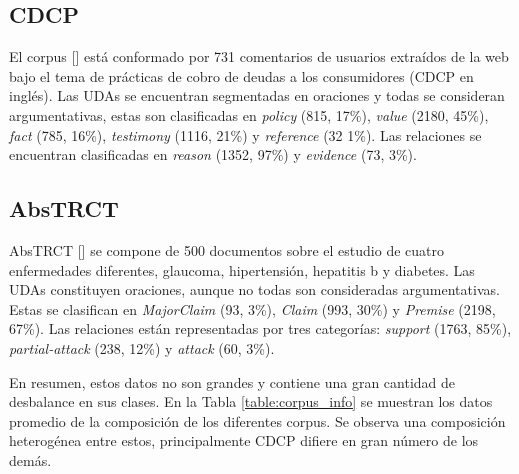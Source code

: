 \subsection{CDCP}\label{corpus:cdcp}

El corpus [\cite{niculae2017argument}] está conformado por 731 comentarios de usuarios extraídos de la web bajo el tema de 
prácticas de cobro de deudas a los consumidores (CDCP en inglés).
Las UDAs se encuentran segmentadas en oraciones y todas se consideran argumentativas, estas son clasificadas en 
\emph{policy} (815, 17\%), \emph{value} (2180, 45\%), \emph{fact} (785, 16\%), \emph{testimony} (1116, 21\%) y \emph{reference} (32 1\%). 
Las relaciones se encuentran clasificadas en \emph{reason} (1352, 97\%) y \emph{evidence} (73, 3\%).

\subsection{AbsTRCT}

AbsTRCT [\cite{mayer2020transformer}] se compone de 500 documentos sobre el estudio de cuatro enfermedades diferentes,
glaucoma, hipertensión, hepatitis b y diabetes. Las UDAs constituyen oraciones, aunque no todas son consideradas
argumentativas. Estas se clasifican en \emph{MajorClaim} (93, 3\%), \emph{Claim} (993, 30\%) y \emph{Premise} (2198, 67\%).
Las relaciones están representadas por tres categorías: \emph{support} (1763, 85\%), \emph{partial-attack} (238, 12\%) y
\emph{attack} (60, 3\%).

En resumen, estos datos no son grandes y contiene una gran cantidad de desbalance en sus clases.
En la Tabla \ref{table:corpus_info} se muestran los datos promedio de la composición de los diferentes corpus. 
Se observa una composición heterogénea entre estos, principalmente CDCP difiere en gran número de los demás.

\begin{table}[h!]
	\begin{center}
	\caption{Información de promedios de los conjuntos de datos.}\label{table:corpus_info}
	\end{center}
\end{table}

